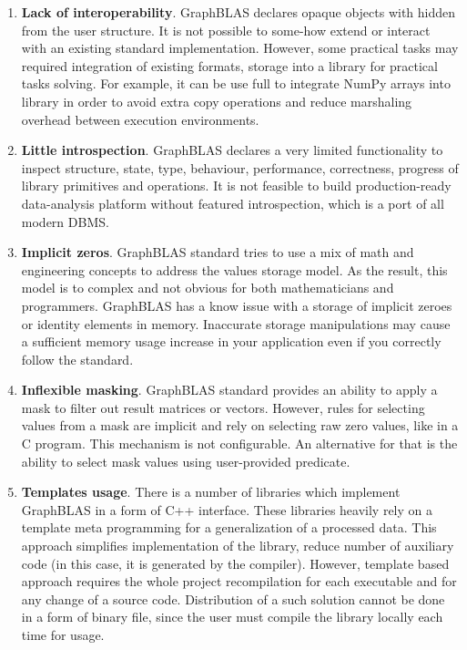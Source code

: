 \begin{enumerate}

\item \textbf{Lack of interoperability}\label{issue1}. GraphBLAS declares opaque objects with hidden from the user structure. It is not possible to some-how extend or interact with an existing standard implementation. However, some practical tasks may required integration of existing formats, storage into a library for practical tasks solving. For example, it can be use full to integrate NumPy arrays into library in order to avoid extra copy operations and reduce marshaling overhead between execution environments.

\item \textbf{Little introspection}\label{issue2}. GraphBLAS declares a very limited functionality to inspect structure, state, type, behaviour, performance, correctness, progress of library primitives and operations. It is not feasible to build production-ready data-analysis platform without featured introspection, which is a port of all modern DBMS.

\item \textbf{Implicit zeros}\label{issue3}. GraphBLAS standard tries to use a mix of math and engineering concepts to address the values storage model. As the result, this model is to complex and not obvious for both mathematicians and programmers. GraphBLAS has a know issue with a storage of implicit zeroes or identity elements in memory. Inaccurate storage manipulations may cause a sufficient memory usage increase in your application even if you correctly follow the standard.

\item \textbf{Inflexible masking}\label{issue4}. GraphBLAS standard provides an ability to apply a mask to filter out result matrices or vectors. However, rules for selecting values from a mask are implicit and rely on selecting raw zero values, like in a C program. This mechanism is not configurable. An alternative for that is the ability to select mask values using user-provided predicate.

\item \textbf{Templates usage}\label{issue5}. There is a number of libraries which implement GraphBLAS in a form of C++ interface. These libraries heavily rely on a template meta programming for a generalization of a processed data. This approach simplifies implementation of the library, reduce number of auxiliary code (in this case, it is generated by the compiler). However, template based approach requires the whole project recompilation for each executable and for any change of a source code. Distribution of a such solution cannot be done in a form of binary file, since the user must compile the library locally each time for usage.


\end{enumerate}
